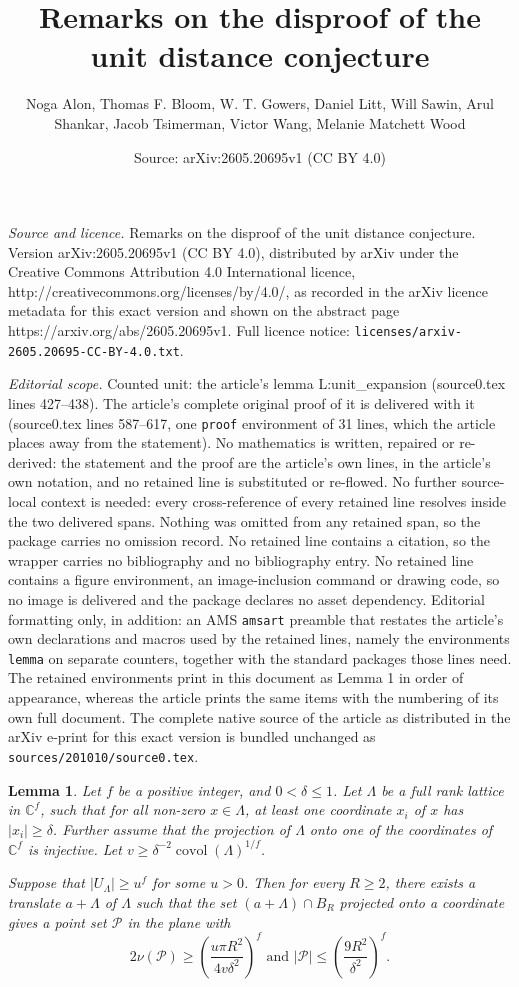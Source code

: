 \documentclass[10pt,a4paper]{amsart}
\title{Remarks on the disproof of the unit distance conjecture}
\author{Noga Alon, Thomas F. Bloom, W. T. Gowers, Daniel Litt, Will Sawin, Arul Shankar, Jacob Tsimerman, Victor Wang, Melanie Matchett Wood}
\date{Source: arXiv:2605.20695v1 (CC BY 4.0)}
\newtheorem{lemma}{Lemma}
\newcommand{\C}{\mathbb{C}}
\newcommand{\mc}{\mathcal}
\begin{document}
\maketitle

\noindent\emph{Source and licence.} Remarks on the disproof of the unit distance conjecture. Version arXiv:2605.20695v1 (CC BY 4.0), distributed by arXiv under the Creative Commons Attribution 4.0 International licence, http://creativecommons.org/licenses/by/4.0/, as recorded in the arXiv licence metadata for this exact version and shown on the abstract page https://arxiv.org/abs/2605.20695v1. Full licence notice: \texttt{licenses/arxiv-2605.20695-CC-BY-4.0.txt}.\par\smallskip

\noindent\textit{Editorial scope.} Counted unit: the article's lemma L:unit\_expansion (source0.tex lines 427--438). The article's complete original proof of it is delivered with it (source0.tex lines 587--617, one \texttt{proof} environment of 31 lines, which the article places away from the statement). No mathematics is written, repaired or re-derived: the statement and the proof are the article's own lines, in the article's own notation, and no retained line is substituted or re-flowed.  No further source-local context is needed: every cross-reference of every retained line resolves inside the two delivered spans.  Nothing was omitted from any retained span, so the package carries no omission record.  No retained line contains a citation, so the wrapper carries no bibliography and no bibliography entry.  No retained line contains a figure environment, an image-inclusion command or drawing code, so no image is delivered and the package declares no asset dependency.  Editorial formatting only, in addition: an AMS \texttt{amsart} preamble that restates the article's own declarations and macros used by the retained lines, namely the environments \texttt{lemma} on separate counters, together with the standard packages those lines need.  The retained environments print in this document as Lemma 1 in order of appearance, whereas the article prints the same items with the numbering of its own full document.  The complete native source of the article as distributed in the arXiv e-print for this exact version is bundled unchanged as \texttt{sources/201010/source0.tex}.
\begin{lemma}\label{L:unit_expansion}
    Let $f$ be a positive integer, and $0<\delta\leq 1$.  Let $\Lambda$ be a full rank lattice in $\C^f$, such that for all non-zero $x\in \Lambda$, at least one coordinate $x_i$ of $x$ has $|x_i|\geq \delta$.  Further assume that the projection of $\Lambda$ onto one of the coordinates of $\C^f$ is injective.  
    Let $v\geq\delta^{-2}\operatorname{covol}(\Lambda)^{1/f}$.  
    
    Suppose that $|U_\Lambda|\geq u^f$ for some $u>0$.
    Then for every $R\geq 2$,
    there exists a translate $a+\Lambda$ of $\Lambda$ such that
    the set $(a+\Lambda)\cap B_R$ projected onto a coordinate gives a point set $\mc{P}$ in the plane with 
    $$
     2\nu(\mc{P})\geq \left(\frac{u \pi R^2}{4v\delta^{2}}\right)^f \textrm{ and } |\mc{P}|\leq\left(\frac{9R^2}{\delta^2}\right)^{f}.
    $$
\end{lemma}
\end{document}
